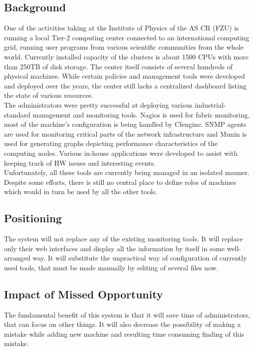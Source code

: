\documentclass[12pt]{article}
\begin{document}
\subsection{Background}
One of the activities taking at the Institute of Physics of the AS CR (FZU) is running a local Tier-2 computing center connected to 
an international computing grid, running user programs from various scientific communities from the whole world. Currently 
installed capacity of the clusters is about 1500 CPUs with more than 250TB of disk storage. The center itself consists of several 
hundreds of physical machines. While certain policies and management tools were developed and deployed over the years, the center 
still lacks a centralized dashboard listing the state of various resources.\\
The administrators were pretty successful at deploying various industrial-standard management and monitoring tools. Nagios is used 
for fabric monitoring, most of the machine's configuration is being handled by Cfengine. SNMP agents are used for monitoring 
critical parts of the network infrastructure and Munin is used for generating graphs depicting performance characteristics of the 
computing nodes. Various in-house applications were developed to assist with keeping track of HW issues and interesting events.\\
Unfortunately, all these tools are currently being managed in an isolated manner. Despite some efforts, there is still no central 
place to define roles of machines which would in turn be used by all the other tools.

 
\subsection{Positioning}
The system will not replace any of the existing monitoring tools. It will replace only their web interfaces and display all the 
information by itself in some well-arranged way. It will substitute the unpractical way of configuration of currently used tools, 
that must be made manually by editing of several files now.

\subsection{Impact of Missed Opportunity}
The fundamental benefit of this system is that it will save time of administrators, that can focus on other things. It will also 
decrease the possibility of making a mistake while adding new machine and resulting time consuming finding of this mistake.
\end{document}
